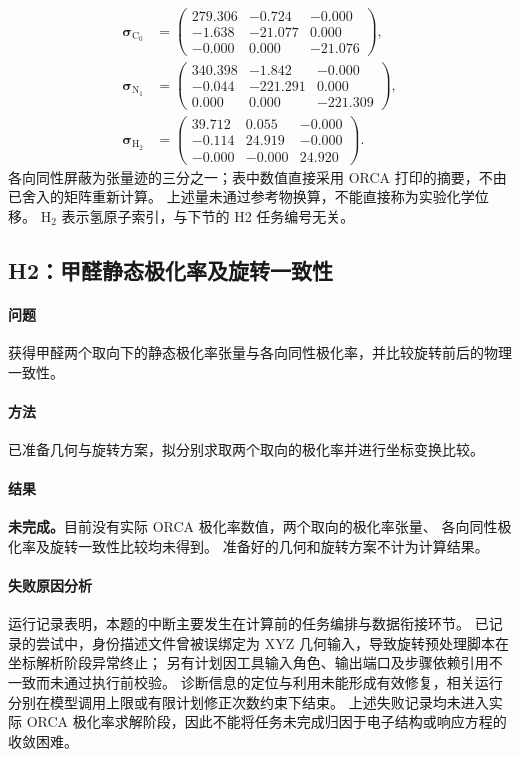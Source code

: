 \begin{equation}
  \begin{aligned}
    \bm{\sigma}_{\mathrm{C}_0}&=\begin{pmatrix}
      279.306 & -0.724 & -0.000 \\
      -1.638 & -21.077 & 0.000 \\
      -0.000 & 0.000 & -21.076
    \end{pmatrix},\\[0.8em]
    \bm{\sigma}_{\mathrm{N}_1}&=\begin{pmatrix}
      340.398 & -1.842 & -0.000 \\
      -0.044 & -221.291 & 0.000 \\
      0.000 & 0.000 & -221.309
    \end{pmatrix},\\[0.8em]
    \bm{\sigma}_{\mathrm{H}_2}&=\begin{pmatrix}
      39.712 & 0.055 & -0.000 \\
      -0.114 & 24.919 & -0.000 \\
      -0.000 & -0.000 & 24.920
    \end{pmatrix}.
  \end{aligned}
  \label{eq:h1-tensors}
\end{equation}
各向同性屏蔽为张量迹的三分之一；表中数值直接采用 ORCA 打印的摘要，不由已舍入的矩阵重新计算。%
上述量未通过参考物换算，不能直接称为实验化学位移。%
H$_2$ 表示氢原子索引，与下节的 H2 任务编号无关。

\subsection{H2：甲醛静态极化率及旋转一致性}
\paragraph{问题}
获得甲醛两个取向下的静态极化率张量与各向同性极化率，并比较旋转前后的物理一致性。

\paragraph{方法}
已准备几何与旋转方案，拟分别求取两个取向的极化率并进行坐标变换比较。

\paragraph{结果}
\textbf{未完成。}目前没有实际 ORCA 极化率数值，两个取向的极化率张量、%
各向同性极化率及旋转一致性比较均未得到。%
准备好的几何和旋转方案不计为计算结果。

\paragraph{失败原因分析}
运行记录表明，本题的中断主要发生在计算前的任务编排与数据衔接环节。%
已记录的尝试中，身份描述文件曾被误绑定为 XYZ 几何输入，导致旋转预处理脚本在坐标解析阶段异常终止；%
另有计划因工具输入角色、输出端口及步骤依赖引用不一致而未通过执行前校验。%
诊断信息的定位与利用未能形成有效修复，相关运行分别在模型调用上限或有限计划修正次数约束下结束。%
上述失败记录均未进入实际 ORCA 极化率求解阶段，因此不能将任务未完成归因于电子结构或响应方程的收敛困难。
